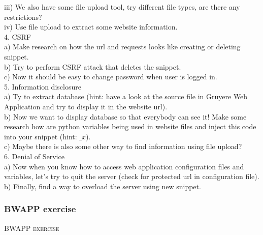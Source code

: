 \documentclass[12pt, a4paper]{article}
\begin{document}
	iii) We also have some file upload tool, try different file types, are there any restrictions?\\
	
	iv) Use file upload to extract some website information.\\
	
	4. CSRF\\
	
	a) Make research on how the url and requests looks like creating or deleting snippet.\\
	
	b) Try to perform CSRF attack that deletes the snippet.\\
	
	c) Now it should be easy to change password when user is logged in.\\
	
	5. Information disclosure\\
	
	a) Ty to extract database (hint: have a look at the source file in Gruyere Web Application and try to display it in the website url).\\
	
	b) Now we want to display database so that everybody can see it! Make some research how are python variables being used in website files and inject this code into your snippet (hint: {{$\_x$}}).\\
	
	c) Maybe there is also some other way to find information using file upload?\\
	
	6. Denial of Service\\
	
	a) Now when you know how to access web application configuration files and variables, let's try to quit the server (check for protected url in configuration file).\\
	
	b) Finally, find a way to overload the server using new snippet.\\
	
	
\newpage{}	


\subsubsection{BWAPP exercise}
		\begin{center} \textsc{BWAPP exercise}			
		\end{center}
\end{document}
